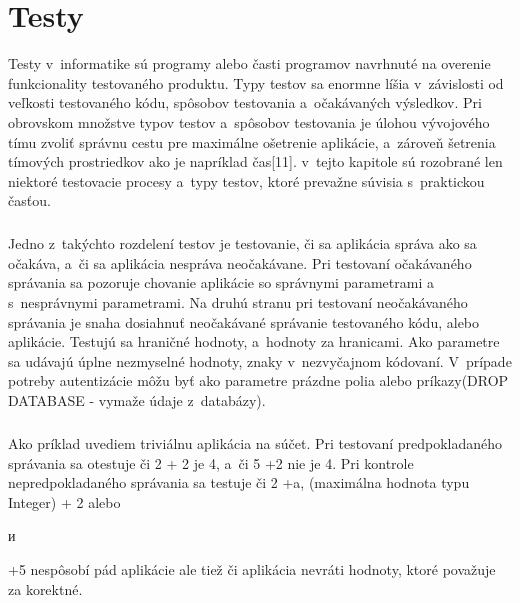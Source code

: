 \documentclass[
  digital, %
  table,   %
oneside,
  nolof,     %
  nolot,     %
]{fithesis3}
\begin{document}
\chapter{Testy}
Testy v~informatike sú programy alebo časti programov navrhnuté na overenie funkcionality testovaného produktu. Typy testov sa enormne líšia v~závislosti od veľkosti testovaného kódu, spôsobov testovania a~očakávaných výsledkov. Pri obrovskom množstve typov testov a~spôsobov testovania je úlohou vývojového tímu zvoliť správnu cestu pre maximálne ošetrenie aplikácie, a~zároveň šetrenia tímových prostriedkov ako je napríklad čas[11].  v~tejto kapitole sú rozobrané len niektoré testovacie procesy a~typy testov, ktoré prevažne súvisia s~praktickou časťou.\paragraph{}
Jedno z~takýchto rozdelení testov je  testovanie, či sa aplikácia správa ako sa očakáva, a~či sa aplikácia nespráva neočakávane. Pri testovaní očakávaného správania sa pozoruje chovanie aplikácie so správnymi parametrami a~ s~nesprávnymi parametrami. Na druhú stranu pri testovaní neočakávaného správania je snaha dosiahnuť neočakávané správanie  testovaného kódu, alebo aplikácie. Testujú sa hraničné hodnoty, a~hodnoty za hranicami. Ako parametre sa udávajú úplne nezmyselné hodnoty, znaky v~nezvyčajnom kódovaní. V~prípade potreby autentizácie môžu byť ako parametre prázdne polia alebo príkazy(DROP DATABASE - vymaže údaje z~databázy). \paragraph{}
Ako príklad uvediem triviálnu aplikácia na súčet. Pri testovaní predpokladaného správania sa otestuje či 2 + 2 je 4, a~či 5 +2 nie je 4. Pri kontrole nepredpokladaného správania sa testuje či 2 +a, (maximálna hodnota typu Integer) + 2 alebo \begin{otherlanguage}{russian} и \end{otherlanguage}  +5   nespôsobí pád aplikácie ale tiež či aplikácia nevráti hodnoty, ktoré považuje za korektné.\paragraph{}
\end{document}
